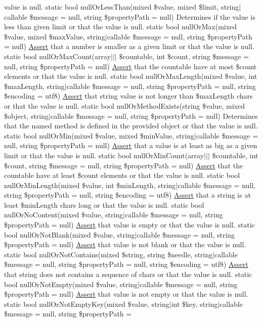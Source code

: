 value is null.  static bool null\+Or\+Less\+Than(mixed \$value, mixed \$limit, string$\vert$callable \$message = null, string \$property\+Path = null) Determines if the value is less than given limit or that the value is null.  static bool null\+Or\+Max(mixed \$value, mixed \$max\+Value, string$\vert$callable \$message = null, string \$property\+Path = null) \mbox{\hyperlink{class_assert_1_1_assert}{Assert}} that a number is smaller as a given limit or that the value is null.  static bool null\+Or\+Max\+Count(array$\vert$$\vert$$\vert$ \$countable, int \$count, string \$message = null, string \$property\+Path = null) \mbox{\hyperlink{class_assert_1_1_assert}{Assert}} that the countable have at most \$count elements or that the value is null.  static bool null\+Or\+Max\+Length(mixed \$value, int \$max\+Length, string$\vert$callable \$message = null, string \$property\+Path = null, string \$encoding = \textquotesingle{}utf8\textquotesingle{}) \mbox{\hyperlink{class_assert_1_1_assert}{Assert}} that string value is not longer than \$max\+Length chars or that the value is null.  static bool null\+Or\+Method\+Exists(string \$value, mixed \$object, string$\vert$callable \$message = null, string \$property\+Path = null) Determines that the named method is defined in the provided object or that the value is null.  static bool null\+Or\+Min(mixed \$value, mixed \$min\+Value, string$\vert$callable \$message = null, string \$property\+Path = null) \mbox{\hyperlink{class_assert_1_1_assert}{Assert}} that a value is at least as big as a given limit or that the value is null.  static bool null\+Or\+Min\+Count(array$\vert$$\vert$$\vert$ \$countable, int \$count, string \$message = null, string \$property\+Path = null) \mbox{\hyperlink{class_assert_1_1_assert}{Assert}} that the countable have at least \$count elements or that the value is null.  static bool null\+Or\+Min\+Length(mixed \$value, int \$min\+Length, string$\vert$callable \$message = null, string \$property\+Path = null, string \$encoding = \textquotesingle{}utf8\textquotesingle{}) \mbox{\hyperlink{class_assert_1_1_assert}{Assert}} that a string is at least \$min\+Length chars long or that the value is null.  static bool null\+Or\+No\+Content(mixed \$value, string$\vert$callable \$message = null, string \$property\+Path = null) \mbox{\hyperlink{class_assert_1_1_assert}{Assert}} that value is empty or that the value is null.  static bool null\+Or\+Not\+Blank(mixed \$value, string$\vert$callable \$message = null, string \$property\+Path = null) \mbox{\hyperlink{class_assert_1_1_assert}{Assert}} that value is not blank or that the value is null.  static bool null\+Or\+Not\+Contains(mixed \$string, string \$needle, string$\vert$callable \$message = null, string \$property\+Path = null, string \$encoding = \textquotesingle{}utf8\textquotesingle{}) \mbox{\hyperlink{class_assert_1_1_assert}{Assert}} that string does not contains a sequence of chars or that the value is null.  static bool null\+Or\+Not\+Empty(mixed \$value, string$\vert$callable \$message = null, string \$property\+Path = null) \mbox{\hyperlink{class_assert_1_1_assert}{Assert}} that value is not empty or that the value is null.  static bool null\+Or\+Not\+Empty\+Key(mixed \$value, string$\vert$int \$key, string$\vert$callable \$message = null, string \$property\+Path = 